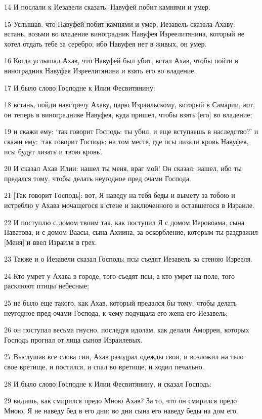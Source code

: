 \par 14 И послали к Иезавели сказать: Навуфей побит камнями и умер.
\par 15 Услышав, что Навуфей побит камнями и умер, Иезавель сказала Ахаву: встань, возьми во владение виноградник Навуфея Изреелитянина, который не хотел отдать тебе за серебро; ибо Навуфея нет в живых, он умер.
\par 16 Когда услышал Ахав, что Навуфей был убит, встал Ахав, чтобы пойти в виноградник Навуфея Изреелитянина и взять его во владение.
\par 17 И было слово Господне к Илии Фесвитянину:
\par 18 встань, пойди навстречу Ахаву, царю Израильскому, который в Самарии, вот, он теперь в винограднике Навуфея, куда пришел, чтобы взять [его] во владение;
\par 19 и скажи ему: `так говорит Господь: ты убил, и еще вступаешь в наследство?' и скажи ему: `так говорит Господь: на том месте, где псы лизали кровь Навуфея, псы будут лизать и твою кровь'.
\par 20 И сказал Ахав Илии: нашел ты меня, враг мой! Он сказал: нашел, ибо ты предался тому, чтобы делать неугодное пред очами Господа.
\par 21 [Так говорит Господь]: вот, Я наведу на тебя беды и вымету за тобою и истреблю у Ахава мочащегося к стене и заключенного и оставшегося в Израиле.
\par 22 И поступлю с домом твоим так, как поступил Я с домом Иеровоама, сына Наватова, и с домом Ваасы, сына Ахиина, за оскорбление, которым ты раздражил [Меня] и ввел Израиля в грех.
\par 23 Также и о Иезавели сказал Господь: псы съедят Иезавель за стеною Изрееля.
\par 24 Кто умрет у Ахава в городе, того съедят псы, а кто умрет на поле, того расклюют птицы небесные;
\par 25 не было еще такого, как Ахав, который предался бы тому, чтобы делать неугодное пред очами Господа, к чему подущала его жена его Иезавель;
\par 26 он поступал весьма гнусно, последуя идолам, как делали Аморреи, которых Господь прогнал от лица сынов Израилевых.
\par 27 Выслушав все слова сии, Ахав разодрал одежды свои, и возложил на тело свое вретище, и постился, и спал во вретище, и ходил печально.
\par 28 И было слово Господне к Илии Фесвитянину, и сказал Господь:
\par 29 видишь, как смирился предо Мною Ахав? За то, что он смирился предо Мною, Я не наведу бед в его дни; во дни сына его наведу беды на дом его.

